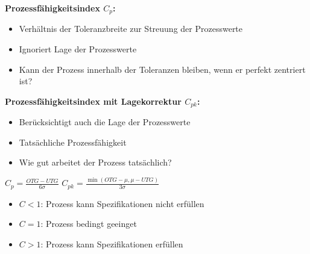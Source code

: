 \textbf{Prozessfähigkeitsindex $C_p$:} 
\begin{itemize}
    \item Verhältnis der Toleranzbreite zur Streuung der Prozesswerte
    \item Ignoriert Lage der Prozesswerte
    \item Kann der Prozess innerhalb der Toleranzen bleiben, wenn er perfekt zentriert ist?
\end{itemize}
\hspace{0.05\linewidth}
\vfill \null \columnbreak

\textbf{Prozessfähigkeitsindex mit Lagekorrektur $C_{pk}$:}
\begin{itemize}
    \item Berücksichtigt auch die Lage der Prozesswerte
    \item Tatsächliche Prozessfähigkeit
    \item Wie gut arbeitet der Prozess tatsächlich?
\end{itemize}
\hspace{0.05\linewidth}

\begin{center}
    $C_p = \frac{OTG - UTG}{6\sigma}$ \hspace{1cm}
    $C_{pk} = \frac{\min\left(OTG - \mu, \mu - UTG\right)}{3\sigma}$
\end{center}
\hspace{0.05\linewidth}

\begin{minipage}{0.7\linewidth
    }
    \begin{itemize}
        \item $C < 1 $: Prozess kann Spezifikationen nicht erfüllen
        \item $C = 1 $: Prozess bedingt geeinget
        \item $C > 1 $: Prozess kann Spezifikationen erfüllen
    \end{itemize}
\end{minipage}
\vspace{1mm}
\hspace{0.05\linewidth}
